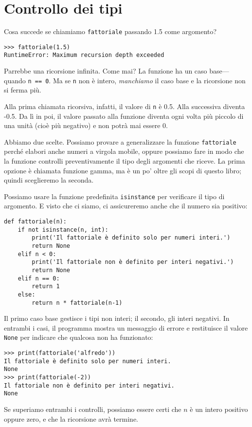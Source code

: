 \documentclass[10pt]{book}
\begin{document}
\section{Controllo dei tipi}
\label{guardian}

Cosa succede se chiamiamo {\tt fattoriale} passando 1.5 come argomento?

\begin{verbatim}
>>> fattoriale(1.5)
RuntimeError: Maximum recursion depth exceeded
\end{verbatim}
%
Parrebbe una ricorsione infinita. Come mai?
La funzione ha un caso base---quando {\tt n == 0}.  Ma se {\tt n} non è intero,
{\em manchiamo} il caso base e la ricorsione non si ferma più.

Alla prima chiamata ricorsiva, infatti, il valore di {\tt n} è 0.5.
Alla successiva diventa -0.5. Da lì in poi, il valore passato alla funzione diventa ogni volta più piccolo di una unità (cioè più negativo) e non potrà mai essere 0.

Abbiamo due scelte. Possiamo provare a generalizzare la funzione {\tt fattoriale} perché elabori anche numeri a virgola mobile, oppure possiamo fare in modo che la funzione controlli preventivamente il tipo degli argomenti che riceve. La prima opzione è chiamata funzione gamma, ma è un po' oltre gli scopi di questo libro; quindi sceglieremo la seconda.

Possiamo usare la funzione predefinita {\tt isinstance} per verificare il tipo di argomento. E visto che ci siamo, ci assicureremo anche che il numero sia positivo:

\begin{verbatim}
def fattoriale(n):
    if not isinstance(n, int):
        print('Il fattoriale è definito solo per numeri interi.')
        return None
    elif n < 0:
        print('Il fattoriale non è definito per interi negativi.')
        return None
    elif n == 0:
        return 1
    else:
        return n * fattoriale(n-1)
\end{verbatim}
%
Il primo caso base gestisce i tipi non interi; il secondo, gli interi negativi. In entrambi i casi, il programma mostra un messaggio di errore e restituisce il valore {\tt None} per indicare che qualcosa non ha funzionato:

\begin{verbatim}
>>> print(fattoriale('alfredo'))
Il fattoriale è definito solo per numeri interi.
None
>>> print(fattoriale(-2))
Il fattoriale non è definito per interi negativi.
None
\end{verbatim}
% 
Se superiamo entrambi i controlli, possiamo essere
   certi che $n$ è un intero positivo oppure zero, e che la ricorsione avrà
   termine.
\end{document}
